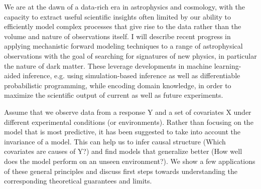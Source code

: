 \documentclass[a4paper,UKenglish]{dagrep-v2021}
\begin{document}
\license

We are at the dawn of a data-rich era in astrophysics and cosmology, with the capacity to extract useful scientific insights often limited by our ability to efficiently model complex processes that give rise to the data rather than the volume and nature of observations itself. I will describe recent progress in applying mechanistic forward modeling techniques to a range of astrophysical observations with the goal of searching for signatures of new physics, in particular the nature of dark matter. These leverage developments in machine learning-aided inference, e.g. using simulation-based inference as well as differentiable probabilistic programming, while encoding domain knowledge, in order to maximize the scientific output of current as well as future experiments.

\license

Assume that we observe data from a response Y and a set of covariates X under different experimental conditions (or environments). Rather than focusing on the model that is most predictive, it has been suggested to take into account the invariance of a model. This can help us to infer causal structure (Which covariates are causes of Y?) and find models that generalize better (How well does the model perform on an unseen environment?). We show a few applications of these general principles and discuss first steps towards understanding the corresponding theoretical guarantees and limits.

\license
\end{document}
